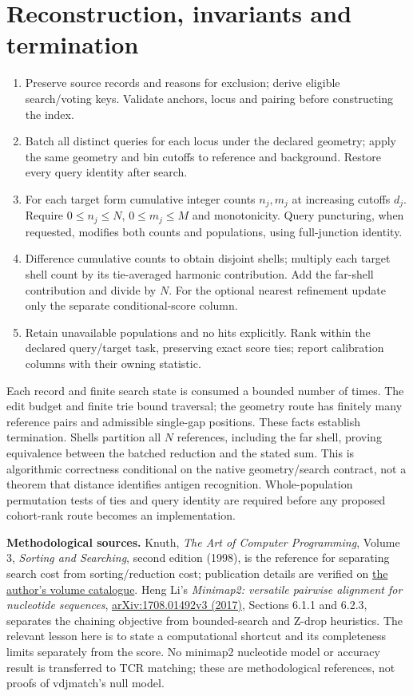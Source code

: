 \documentclass[10pt,a4paper]{article}
\theoremstyle{definition}
\begin{document}
\section{Reconstruction, invariants and termination}
\begin{enumerate}\setlength{\itemsep}{1pt}
\item Preserve source records and reasons for exclusion; derive eligible search/voting keys.
      Validate anchors, locus and pairing before constructing the index.
\item Batch all distinct queries for each locus under the declared geometry; apply the same
      geometry and bin cutoffs to reference and background. Restore every query identity after search.
\item For each target form cumulative integer counts $n_j,m_j$ at increasing cutoffs $d_j$.
      Require $0\le n_j\le N$, $0\le m_j\le M$ and monotonicity. Query puncturing, when requested,
      modifies both counts and populations, using full-junction identity.
\item Difference cumulative counts to obtain disjoint shells; multiply each target shell count
      by its tie-averaged harmonic contribution. Add the far-shell contribution and divide by $N$.
      For the optional nearest refinement update only the separate conditional-score column.
\item Retain unavailable populations and no hits explicitly. Rank within the declared query/target
      task, preserving exact score ties; report calibration columns with their owning statistic.
\end{enumerate}
Each record and finite search state is consumed a bounded number of times. The edit budget and
finite trie bound traversal; the geometry route has finitely many reference pairs and admissible
single-gap positions. These facts establish termination. Shells partition all $N$ references,
including the far shell, proving equivalence between the batched reduction and the stated sum.
This is algorithmic correctness conditional on the native geometry/search contract, not a theorem
that distance identifies antigen recognition. Whole-population permutation tests of ties and query
identity are required before any proposed cohort-rank route becomes an implementation.

\textbf{Methodological sources.} Knuth, \emph{The Art of Computer Programming}, Volume 3,
\emph{Sorting and Searching}, second edition (1998), is the reference for separating search cost
from sorting/reduction cost; publication details are verified on
\href{https://www-cs-faculty.stanford.edu/~knuth/taocp.html}{the author's volume catalogue}.
Heng Li's \emph{Minimap2: versatile pairwise alignment for nucleotide sequences},
\href{https://arxiv.org/html/1708.01492v3}{arXiv:1708.01492v3 (2017)},
Sections 6.1.1 and 6.2.3, separates the chaining objective from bounded-search and Z-drop
heuristics. The relevant lesson here is to state a computational shortcut and its completeness
limits separately from the score. No minimap2 nucleotide model or accuracy result is transferred
to TCR matching; these are methodological references, not proofs of vdjmatch's null model.
\end{document}
